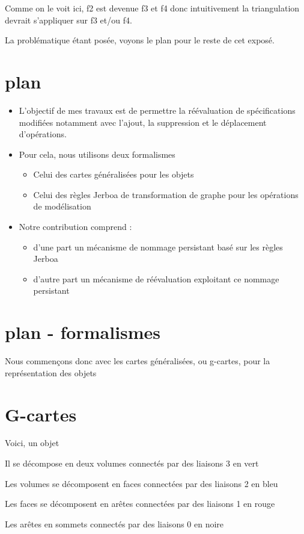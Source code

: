 \documentclass[11pt]{article}
\begin{document}
Comme on le voit ici, f2 est devenue f3 et f4 donc intuitivement la
triangulation devrait s'appliquer sur f3 et/ou f4.

La problématique étant posée, voyons le plan pour le reste de cet exposé.
\section{plan}
\label{sec:orgdf64a4e}
\begin{itemize}
\item L'objectif de mes travaux est de permettre la réévaluation de spécifications
modifiées notamment avec l'ajout, la suppression et le déplacement
d'opérations.
\item Pour cela, nous utilisons deux formalismes
\begin{itemize}
\item Celui des cartes généralisées pour les objets
\item Celui des règles Jerboa de transformation de graphe pour les opérations de
modélisation
\end{itemize}
\item Notre contribution comprend :
\begin{itemize}
\item d'une part un mécanisme de nommage persistant basé sur les règles Jerboa
\item d'autre part un mécanisme de réévaluation exploitant ce nommage persistant
\end{itemize}
\end{itemize}
\section{plan - formalismes}
\label{sec:orgfbb8259}

Nous commençons donc avec les cartes généralisées, ou g-cartes, pour la
représentation des objets
\section{G-cartes}
\label{sec:orgf33c57b}
Voici, un objet

Il se décompose en deux volumes connectés par des liaisons 3 en vert

Les volumes se décomposent en faces connectées par des liaisons 2 en bleu

Les faces se décomposent en arêtes connectées par des liaisons 1 en rouge

Les arêtes en sommets connectés par des liaisons 0 en noire
\end{document}
